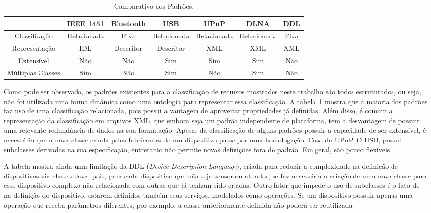 \begin{table}
	\begin{center}
	\resizebox{16cm}{!} {
		\begin{tabular}{ccccccc}
		\hline
							& \textbf{IEEE 1451}	& \textbf{Bluetooth} 	& \textbf{USB}	& \textbf{UPnP} & \textbf{DLNA} & \textbf{DDL}\\
		\hline
		Classificação 		& Relacionada 			& Fixa 					& Relacionada 	& Relacionada 	& Relacionada 	& Fixa \\
		\hline
		Representação 		& IDL 					& Descritor				& Descritor		& XML			& XML 			& XML \\ 
		\hline
		Extensível 			& Não 					& Não 					& Sim 			& Sim 			& Sim 			& Não \\
		\hline
		Múltiplas Classes 	& Sim 					& Não					& Sim 			& Não 			& Sim 			& Não \\
		\hline
		\end{tabular}
	}
	\end{center}
	\caption{Comparativo dos Padrões.}
	\label{tab:comparativo}
\end{table}
 
Como pode ser observado, os padrões existentes para a classificação de recursos mostrados neste trabalho são todos estruturados, ou seja, não foi utilizada uma forma dinâmica como uma ontologia para representar essa classificação. A tabela~\ref{tab:comparativo} mostra que a maioria dos padrões faz uso de uma classificação relacionada, pois possui a vantagem de aproveitar propriedades já definidas. Além disso, é comum a representação da classificação em arquivos XML, que embora seja um padrão independente de plataforma, tem a desvantagem de possuir uma relevante redundância de dados na sua formatação. Apesar da classificação de alguns padrões possuir a capacidade de ser extensível, é necessário que a nova classe criada pelos fabricantes de um dispositivo passe por uma homologação. Caso do UPnP. O USB, possui subclasses derivadas na sua especificação, entretanto não permite novas definições fora do padrão. Em geral, são pouco flexíveis. 

A tabela mostra ainda uma limitação da DDL (\emph{Device Description Language}), criada para reduzir a complexidade na definição de dispositivos via classes Java, pois, para cada dispositivo que não seja sensor ou atuador, se faz necessária a criação de uma nova classe para esse dispositivo complexo não relacionada com outras que já tenham sido criadas. Outro fator que impede o uso de subclasses é o fato de na definição do dispositivo, estarem definidos também seus serviços, modelados como operações. Se um dispositivo possuir apenas uma operação que receba parâmetros diferentes, por exemplo, a classe anteriormente definida não poderá ser reutilizada. 

